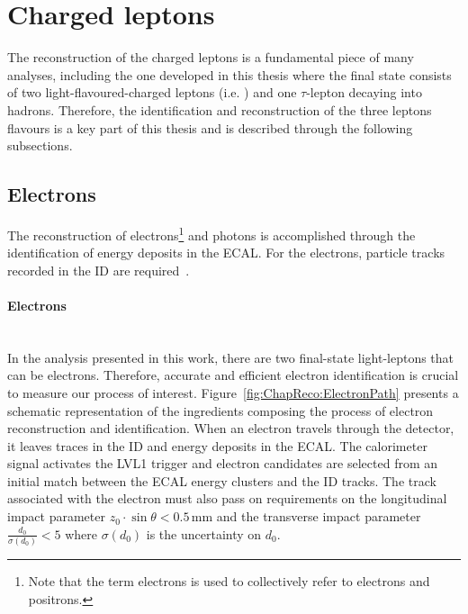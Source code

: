 \section{Charged leptons}
\label{sec:Chap3:Reco:Leptons}
The reconstruction of the charged leptons is a fundamental piece of many analyses, 
including the one developed in this thesis where the final state consists
of two light-flavoured-charged leptons (i.e. \emu) and one $\tau$-lepton  
decaying into hadrons. Therefore, the identification and reconstruction 
of the three leptons flavours is a key part of this thesis and is described
through the following subsections.


\subsection{Electrons}
\label{sec:Chap3:Reco:ElectronsAndPhotons}

The reconstruction of electrons\footnote{Note that the term electrons is used to 
collectively refer to electrons and positrons.} and photons is accomplished through 
the identification of energy deposits in the ECAL.
For the electrons, particle tracks recorded in the ID are required~\cite{ATLAS:2019qmc, ATLAS:2019jvq}.


\paragraph{Electrons}\mbox{}\\
In the analysis presented in this work, there are two final-state light-leptons 
that can be electrons. Therefore, accurate and efficient electron identification 
is crucial to measure our process of interest.
 Figure~\ref{fig:ChapReco:ElectronPath} presents 
a schematic representation of the ingredients composing the process 
of electron reconstruction and identification.
When an electron travels through the detector, it leaves traces in the ID
and energy deposits in the ECAL. The calorimeter signal activates the LVL1 trigger
and electron candidates are selected from an initial match between the ECAL energy
clusters and the ID tracks. %
The track associated with the electron must also pass on requirements  
on the longitudinal impact parameter 
$z_{0} \cdot \sin\theta < 0.5\,$mm and 
the transverse impact parameter $\frac{d_{0}}{\sigma(d_{0})} < 5$ where $\sigma(d_{0})$ is the uncertainty on $d_{0}$.

